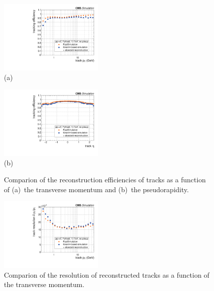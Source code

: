 \documentclass[a4paper]{jpconf}
\begin{document}
\begin{figure}[htbp]
\begin{center}
\parbox{0.46\textwidth}{\centering\includegraphics[width=0.45\textwidth]{figures/eff_pt.pdf}\\(a)}
\hspace{0.05\textwidth}
\parbox{0.46\textwidth}{\centering\includegraphics[width=0.45\textwidth]{figures/eff_eta.pdf}\\(b)}
\caption{Comparion of the reconstruction efficiencies of tracks as a function of (a)~the transverse momentum and (b)~the pseudorapidity.}
\end{center}
\end{figure}

\begin{figure}[htbp]
\begin{center}
\includegraphics[width=0.45\textwidth]{figures/res_pt.pdf}
\caption{Comparion of the resolution of reconstructed tracks as a function of the transverse momentum.}
\end{center}
\end{figure}
\end{document}
